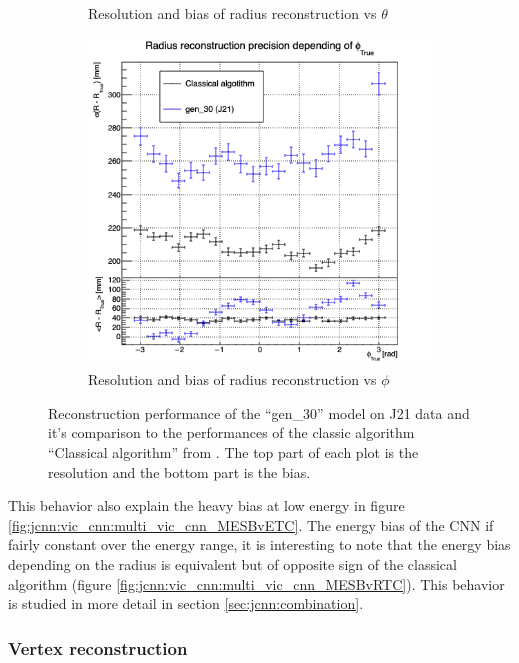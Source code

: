 \begin{figure}[ht]
\begin{subfigure}[t]{0.32\linewidth}
    \caption{Resolution and bias of radius reconstruction vs $\theta$}
    \label{fig:jcnn:vic_cnn:multi_vic_cnn_MSBvTTC}
  \end{subfigure}
  \begin{subfigure}[t]{0.32\linewidth}
    \centering
    \includegraphics[width=\linewidth]{images/jcnn/vic_cnn/multi_vic_cnn_MSBvPTC.png}
    \caption{Resolution and bias of radius reconstruction vs $\phi$}
    \label{fig:jcnn:vic_cnn:multi_vic_cnn_MSBvPTC}
  \end{subfigure}
  \caption{Reconstruction performance of the ``gen\_30'' model on J21 data and it's comparison to the performances of the classic algorithm ``Classical algorithm'' from \cite{lebrin_towards_2022}. The top part of each plot is the resolution and the bottom part is the bias.}
  \label{fig:jcnn:vic_cnn}
\end{figure}

This behavior also explain the heavy bias at low energy in figure \ref{fig:jcnn:vic_cnn:multi_vic_cnn_MESBvETC}. The energy bias of the CNN if fairly constant over the energy range, it is interesting to note that the energy bias depending on the radius is equivalent but of opposite sign of the classical algorithm (figure \ref{fig:jcnn:vic_cnn:multi_vic_cnn_MESBvRTC}). This behavior is studied in more detail in section \ref{sec:jcnn:combination}.

\subsubsection{Vertex reconstruction}

